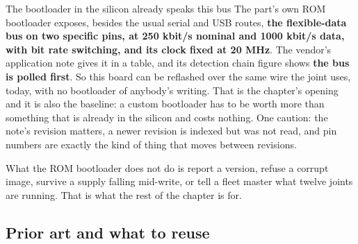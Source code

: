 \begin{note}{The bootloader in the silicon already speaks this bus}
The part's own ROM bootloader exposes, besides the usual serial and USB routes,
\textbf{the flexible-data bus on two specific pins, at 250 kbit/s nominal and
1000 kbit/s data, with bit rate switching, and its clock fixed at 20 MHz}. The
vendor's application note gives it in a table, and its detection chain figure
shows \textbf{the bus is polled first}. So this board can be reflashed over the
same wire the joint uses, today, with no bootloader of anybody's writing. That
is the chapter's opening and it is also the baseline: a custom bootloader has to
be worth more than something that is already in the silicon and costs nothing.
One caution: the note's revision matters, a newer revision is indexed but was
not read, and pin numbers are exactly the kind of thing that moves between
revisions.
\end{note}

What the ROM bootloader does not do is report a version, refuse a corrupt image,
survive a supply falling mid-write, or tell a fleet master what twelve joints
are running. That is what the rest of the chapter is for.

\subsection*{Prior art and what to reuse}

